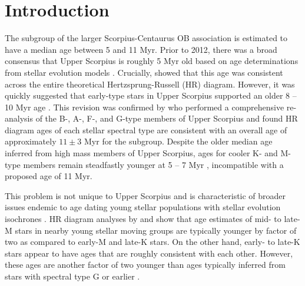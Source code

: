 \documentclass{aa}
\begin{document}

   \maketitle
%

\section{Introduction}
The  subgroup of the larger Scorpius-Centaurus OB association is estimated to have a median age between 5 and 11 Myr. Prior to 2012, there was a broad consensus that Upper Scorpius is roughly 5 Myr old based on age determinations from stellar evolution models \citep{deGeus1992, Preibisch2002, Slesnick2008}. Crucially, \citet{Preibisch2002} showed that this age was consistent across the entire theoretical Hertzsprung-Russell (HR) diagram. However, it was quickly suggested that early-type stars in Upper Scorpius supported an older 8 -- 10 Myr age \citep{Sartori2003}. This revision was confirmed by \citet{Pecaut2012} who performed a comprehensive re-analysis of the B-, A-, F-, and G-type members of Upper Scorpius and found HR diagram ages of each stellar spectral type are consistent with an overall age of approximately $11\pm3$ Myr for the subgroup. Despite the older median age inferred from high mass members of Upper Scorpius, ages for cooler K- and M-type members remain steadfastly younger at 5 -- 7 Myr \citep[][]{Herczeg2015, Rizzuto2015, Rizzuto2015b}, incompatible with a proposed age of 11 Myr.

This problem is not unique to Upper Scorpius and is characteristic of broader issues endemic to age dating young stellar populations with stellar evolution isochrones \citep[e.g.,][]{Naylor2009, Bell2012, Herczeg2015}. HR diagram analyses by \citet{Malo2014} and \citet{Herczeg2015} show that age estimates of mid- to late-M stars in nearby young stellar moving groups are typically younger by factor of two as compared to early-M and late-K stars. On the other hand, early- to late-K stars appear to have ages that are roughly consistent with each other. However, these ages are another factor of two younger than ages typically inferred from stars with spectral type G or earlier \citep{Hillenbrand2008}. 
\end{document}
